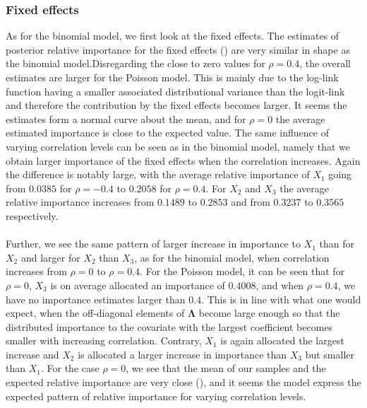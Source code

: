\subsubsection{Fixed effects}
As for the binomial model, we first look at the fixed effects. The estimates of posterior relative importance for the fixed effects () are very similar in shape as the binomial model.Disregarding the close to zero values for $\rho=0.4$, the overall estimates are larger for the Poisson model. This is mainly due to the log-link function having a smaller associated distributional variance than the logit-link and therefore the contribution by the fixed effects becomes larger. It seems the estimates form a normal curve about the mean, and for $\rho=0$ the average estimated importance is close to the expected value. The same influence of varying correlation levels can be seen as in the binomial model, namely that we obtain larger importance of the fixed effects when the correlation increases. Again the difference is notably large, with the average relative importance of $X_1$ going from $0.0385$ for $\rho=-0.4$ to $0.2058$ for $\rho=0.4$. For $X_2$ and $X_3$ the average relative importance increases from $0.1489$ to $0.2853$ and from $0.3237$ to $0.3565$ respectively.
\\
\\
Further, we see the same pattern of larger increase in importance to $X_1$ than for $X_2$ and larger for $X_2$ than $X_3$, as for the binomial model, when correlation increases from $\rho=0$ to $\rho=0.4$. For the Poisson model, it can be seen that for $\rho=0$, $X_3$ is on average allocated an importance of $0.4008$, and when $\rho=0.4$, we have no importance estimates larger than $0.4$. This is in line with what one would expect, when the off-diagonal elements of $\boldsymbol{\Lambda}$ become large enough so that the distributed importance to the covariate with the largest coefficient becomes smaller with increasing correlation. Contrary, $X_1$ is again allocated the largest increase and $X_2$ is allocated a larger increase in importance than $X_3$ but smaller than $X_1$. For the case $\rho=0$, we see that the mean of our samples and the expected relative importance are very close (), and it seems the model express the expected pattern of relative importance for varying correlation levels.
\newline
\newline
